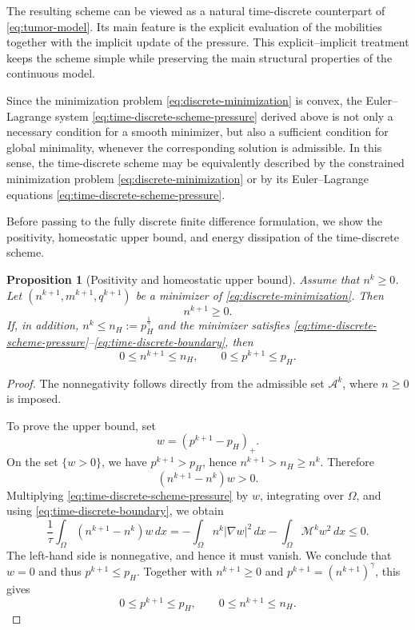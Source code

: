 \documentclass[11pt]{article}
\theoremstyle{plain}
\numberwithin{equation}{section}
\newtheorem{proposition}{Proposition}[section]
\newtheorem{remark}{Remark}[section]
\begin{document}
The resulting scheme can be viewed as a natural time-discrete counterpart of
\eqref{eq:tumor-model}. Its main feature is the explicit evaluation of the
mobilities together with the implicit update of the pressure.
 This explicit--implicit treatment keeps the scheme simple while preserving the
main structural properties of the continuous model. 

Since the minimization problem \eqref{eq:discrete-minimization} is convex, 
the Euler--Lagrange system \eqref{eq:time-discrete-scheme-pressure} derived above
is not only a necessary condition for a smooth minimizer, but also a
sufficient condition for global minimality, whenever the corresponding
solution is admissible. In this sense, the time-discrete scheme may be
equivalently described by the constrained minimization problem \eqref{eq:discrete-minimization} or by its
Euler--Lagrange equations \eqref{eq:time-discrete-scheme-pressure}.

Before passing to the fully discrete finite difference formulation, we show the positivity,
homeostatic upper bound, and energy dissipation of the time-discrete scheme.

\begin{proposition}[Positivity and homeostatic upper bound]
\label{prop:td-positivity-upper-bound}
Assume that \(n^k\ge0\). Let
\((n^{k+1},m^{k+1},q^{k+1})\) be a minimizer of
\eqref{eq:discrete-minimization}. Then
\[
    n^{k+1}\ge0 .
\]
If, in addition, \(n^k\le n_H := p_H^{\frac{1}{\gamma}}\) and the minimizer satisfies
\eqref{eq:time-discrete-scheme-pressure}--\eqref{eq:time-discrete-boundary},
then
\[
    0\le n^{k+1}\le n_H,
    \qquad
    0\le p^{k+1}\le p_H .
\]
\end{proposition}

\begin{proof}
The nonnegativity follows directly from the admissible set
\(\mathcal A^k\), where \(n\ge0\) is imposed.

To prove the upper bound, set
\[
    w=(p^{k+1}-p_H)_+ .
\]
On the set \(\{w>0\}\), we have \(p^{k+1}>p_H\), hence
\(n^{k+1}>n_H\ge n^k\). Therefore
\[
    (n^{k+1}-n^k)w > 0 .
\]
Multiplying \eqref{eq:time-discrete-scheme-pressure} by \(w\), integrating
over \(\Omega\), and using \eqref{eq:time-discrete-boundary}, we obtain
\[
    \frac1\tau\int_\Omega (n^{k+1}-n^k)w\,dx
    =
    -\int_\Omega n^k|\nabla w|^2\,dx
    -
    \int_\Omega \mathcal M^k w^2\,dx
    \le0 .
\]
The left-hand side is nonnegative, and hence it must vanish. 
We conclude that \(w=0\) and thus
\(p^{k+1}\le p_H\). 
Together with \(n^{k+1}\ge0\) and
\(p^{k+1}=(n^{k+1})^\gamma\), this gives
\[
    0\le p^{k+1}\le p_H,
    \qquad
    0\le n^{k+1}\le n_H .
\]
\end{proof}
\end{document}
